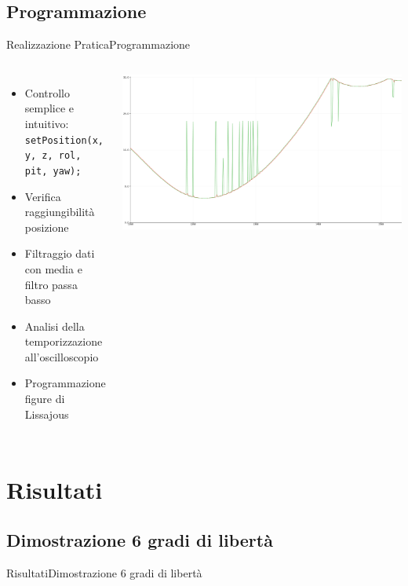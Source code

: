 \documentclass[10pt,aspectratio=169
	]{beamer}
\begin{document}
	\subsection{Programmazione}
	\begin{frame}{Realizzazione Pratica}{Programmazione}
	\begin{columns}
	\begin{itemize}
	
		\item Controllo semplice e intuitivo:\\ 
		\small \texttt{setPosition(x, y, z, rol, pit, yaw);}
		\item Verifica raggiungibilità posizione
		
		\item Filtraggio dati con media e filtro passa basso
		\item Analisi della temporizzazione all'oscilloscopio
		\item Programmazione figure di Lissajous
	\end{itemize}
	\centering \includegraphics[width=\textwidth]{./images/filtraggio2.png}
	\end{columns}
	\end{frame}
	
	\section{Risultati}
	
	\subsection{Dimostrazione 6 gradi di libertà}
	\begin{frame}{Risultati}{Dimostrazione 6 gradi di libertà}
	\centering{}
	\end{frame}
\end{document}
